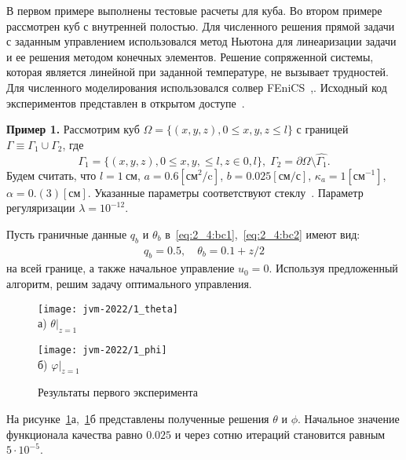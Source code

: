 В первом примере выполнены тестовые расчеты для куба.
Во втором примере рассмотрен куб с внутренней полостью.
Для численного решения прямой задачи с заданным управлением использовался
метод Ньютона для линеаризации задачи и ее решения методом конечных элементов.
Решение сопряженной системы, которая является линейной
при заданной температуре, не вызывает трудностей.
Для численного моделирования использовался солвер FEniCS~\cite{fenics},\cite{dolfin}.
Исходный код экспериментов представлен в открытом доступе~\cite{mesenev-github}.

\textbf{Пример 1.}
Рассмотрим куб $\Omega = \{ (x, y, z), 0 \leq x,y,z \leq l \}$ с границей
$\Gamma \equiv \Gamma_1 \cup \Gamma_2$, где
\[
    \Gamma_1 = \{(x, y, z), 0 \leq x,y, \leq l, z \in 0, l\}, \;
    \Gamma_2 = \partial \Omega \setminus \hat{\Gamma_1}.
\]
Будем считать, что
$l = 1~\text{см}$,
$a = 0.6[\text{см}^2/\text{c}]$,
$b = 0.025[\text{см}/\text{с}]$,
$\kappa_a = 1[\text{см}^{-1}]$,
$\alpha = 0.(3)[\text{см}]$.
Указанные параметры соответствуют стеклу~\cite{Grenkin2016a}.
Параметр регуляризации $\lambda=10^{-12}$.

Пусть граничные данные $q_b$ и $\theta_b$ в~\eqref{eq:2_4:bc1},~\eqref{eq:2_4:bc2} имеют вид:
\begin{gather*}
    q_b = 0.5, \quad
    \theta_b = 0.1 + z/2
\end{gather*}
на всей границе, а также начальное управление $u_0 = 0$.
Используя предложенный алгоритм, решим задачу оптимального управления.

\begin{figure}[h!t]
    \begin{minipage}[b][][b]{0.49\linewidth}
        \centering
        \texttt{[image: jvm-2022/1\_theta]}
        \\ а) $\theta|_{z=1}$
    \end{minipage}
    \hfill
    \begin{minipage}[b][][b]{0.49\linewidth}
        \centering
        \texttt{[image: jvm-2022/1\_phi]}
        \\ б) $\varphi|_{z=1}$
    \end{minipage}
    \caption{Результаты первого эксперимента}
    \label{fig:4_4:5}
\end{figure}

На рисунке~\ref{fig:4_4:5}а,~\ref{fig:4_4:5}б представлены
полученные решения $\theta$ и $\phi$.
Начальное значение функционала качества равно $0.025$ и
через сотню итераций становится равным $5\cdot 10^{-5}$.

